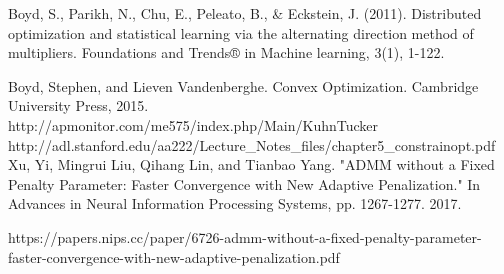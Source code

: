 \documentclass{article}
\begin{document}
\begin{thebibliography}{99}
 Boyd, S., Parikh, N., Chu, E., Peleato, B., \& Eckstein, J. (2011). Distributed optimization and statistical learning via the alternating direction method of multipliers. Foundations and Trends® in Machine learning, 3(1), 1-122.

 Boyd, Stephen, and Lieven Vandenberghe. Convex Optimization. Cambridge University Press, 2015.
 http://apmonitor.com/me575/index.php/Main/KuhnTucker
 http://adl.stanford.edu/aa222/Lecture\_Notes\_files/chapter5\_constrainopt.pdf
 Xu, Yi, Mingrui Liu, Qihang Lin, and Tianbao Yang. "ADMM without a Fixed Penalty Parameter: Faster Convergence with New Adaptive Penalization." In Advances in Neural Information Processing Systems, pp. 1267-1277. 2017.

https://papers.nips.cc/paper/6726-admm-without-a-fixed-penalty-parameter-faster-convergence-with-new-adaptive-penalization.pdf

\end{thebibliography}
\end{document}
